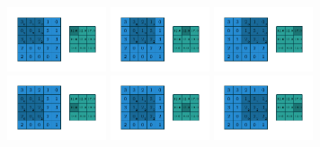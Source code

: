 \begin{figure}[ht]
     \centering
     \begin{subfigure}[b]{0.8\textwidth}
        \centering
        \includegraphics[width=0.32\textwidth]{chapters/assets/2d-conv-example/numerical_no_padding_no_strides_00.pdf}
        \includegraphics[width=0.32\textwidth]{chapters/assets/2d-conv-example/numerical_no_padding_no_strides_01.pdf}
        \includegraphics[width=0.32\textwidth]{chapters/assets/2d-conv-example/numerical_no_padding_no_strides_02.pdf}
        \includegraphics[width=0.32\textwidth]{chapters/assets/2d-conv-example/numerical_no_padding_no_strides_03.pdf}
        \includegraphics[width=0.32\textwidth]{chapters/assets/2d-conv-example/numerical_no_padding_no_strides_04.pdf}
        \includegraphics[width=0.32\textwidth]{chapters/assets/2d-conv-example/numerical_no_padding_no_strides_05.pdf}

\end{subfigure}
\end{figure}
